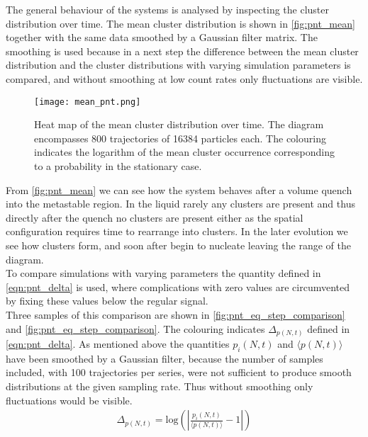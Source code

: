 The general behaviour of the systems is analysed by inspecting the cluster distribution over time. The mean cluster distribution is shown in \autoref{fig:pnt_mean} together with the same data smoothed by a Gaussian filter matrix. The smoothing is used because in a next step the difference between the mean cluster distribution and the cluster distributions with varying simulation parameters is compared, and without smoothing at low count rates only fluctuations are visible.\\


\begin{figure}[h!]
\centering
\texttt{[image: mean\_pnt.png]}
\caption[Gaussian filter applied to p(N,t) measurement]{Heat map of the mean cluster distribution over time. The diagram encompasses 800 trajectories of 16384 particles each. The colouring indicates the logarithm of the mean cluster occurrence corresponding to a probability in the stationary case.}
\label{fig:pnt_mean}
\end{figure}

From \autoref{fig:pnt_mean} we can see how the system behaves after a volume quench into the metastable region. In the liquid rarely any clusters are present and thus directly after the quench no clusters are present either as the spatial configuration requires time to rearrange into clusters. In the later evolution we see how clusters form, and soon after begin to nucleate leaving the range of the diagram.\\

To compare simulations with varying parameters the quantity defined in \autoref{eqn:pnt_delta} is used, where complications with zero values are circumvented by fixing these values below the regular signal.\\ Three samples of this comparison are shown in \autoref{fig:pnt_eq_step_comparison} and \autoref{fig:pnt_eq_step_comparison}. The colouring indicates $\Delta_{p(N,t)}$ defined in \autoref{eqn:pnt_delta}. As mentioned above the quantities $p_i(N,t)$ and $\langle p(N,t) \rangle$ have been smoothed by a Gaussian filter, because the number of samples included, with 100 trajectories per series, were not sufficient to produce smooth distributions at the given sampling rate. Thus without smoothing only fluctuations would be visible.\\ 

\begin{align}
\label{eqn:pnt_delta}
\Delta_{p(N,t)} = \text{log} \left( \left| \frac{p_i(N,t)}{\langle p(N,t) \rangle} -1 \right| \right)
\end{align}


